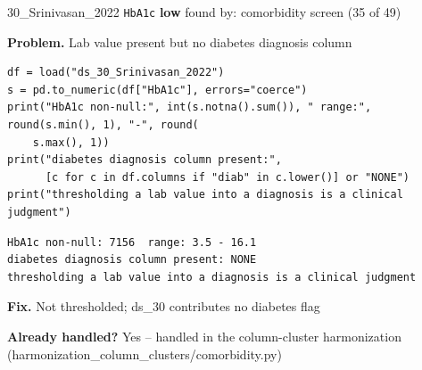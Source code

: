 \documentclass[9pt, t, handout]{beamer}
\newcommand{\ans}[1]{\textcolor{structure.fg}{#1}}
\begin{document}
\begin{frame}[fragile]{30\_Srinivasan\_2022 \quad \texttt{HbA1c}}
  {\scriptsize\textcolor{black!55}{\textbf{low}} \quad
   found by: comorbidity screen \quad (35 of 49)}
  \vspace{3pt}

  {\footnotesize \textbf{Problem.} Lab value present but no diabetes diagnosis column}
  \vspace{4pt}

  \begin{Verbatim}[fontsize=\tiny, frame=single, framesep=2pt, label=\tiny reproduce]
df = load("ds_30_Srinivasan_2022")
s = pd.to_numeric(df["HbA1c"], errors="coerce")
print("HbA1c non-null:", int(s.notna().sum()), " range:", round(s.min(), 1), "-", round(
    s.max(), 1))
print("diabetes diagnosis column present:",
      [c for c in df.columns if "diab" in c.lower()] or "NONE")
print("thresholding a lab value into a diagnosis is a clinical judgment")
  \end{Verbatim}
  \begin{Verbatim}[fontsize=\tiny, frame=single, framesep=2pt, label=\tiny output]
HbA1c non-null: 7156  range: 3.5 - 16.1
diabetes diagnosis column present: NONE
thresholding a lab value into a diagnosis is a clinical judgment
  \end{Verbatim}
  \vspace{2pt}

  {\footnotesize \textbf{Fix.} Not thresholded; ds\_30 contributes no diabetes flag}
  \vspace{2pt}

  {\footnotesize \textbf{Already handled?} \ans{Yes} -- handled in the column-cluster harmonization
   (harmonization\_column\_clusters/comorbidity.py)}
\end{frame}
\end{document}
